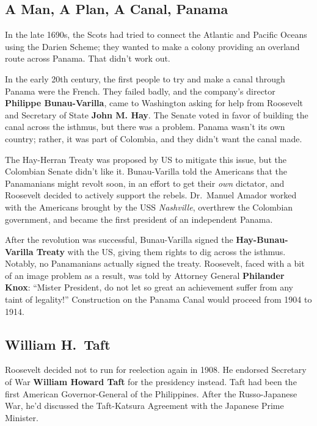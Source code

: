\subsection*{A Man, A Plan, A Canal, Panama}

In the late 1690s, the Scots had tried to connect the Atlantic and Pacific Oceans using the Darien Scheme;
they wanted to make a colony providing an overland route across Panama.
That didn't work out.

In the early 20th century, the first people to try and make a canal through Panama were the French.
They failed badly, and the company's director \textbf{Philippe Bunau-Varilla},
came to Washington asking for help from Roosevelt and Secretary of State \textbf{John M. Hay}.
The Senate voted in favor of building the canal across the isthmus, but there was a problem.
Panama wasn't its own country; rather, it was part of Colombia, and they didn't want the canal made.

The Hay-Herran Treaty was proposed by US to mitigate this issue, but the Colombian Senate didn't like it.
Bunau-Varilla told the Americans that the Panamanians might revolt soon,
in an effort to get their \textit{own} dictator,
and Roosevelt decided to actively support the rebels.
Dr.\ Manuel Amador worked with the Americans brought by the USS \textit{Nashville},
overthrew the Colombian government, and became the first president of an independent Panama.

After the revolution was successful,
Bunau-Varilla signed the \textbf{Hay-Bunau-Varilla Treaty} with the US, giving them rights to dig across the isthmus.
Notably, no Panamanians actually signed the treaty.
Roosevelt, faced with a bit of an image problem as a result,
was told by Attorney General \textbf{Philander Knox}:
``Mister President, do not let so great an achievement suffer from any taint of legality!''
Construction on the Panama Canal would proceed from 1904 to 1914.

\subsection*{William H.\ Taft}

Roosevelt decided not to run for reelection again in 1908.
He endorsed Secretary of War \textbf{William Howard Taft} for the presidency instead.
Taft had been the first American Governor-General of the Philippines.
After the Russo-Japanese War, he'd discussed the Taft-Katsura Agreement with the Japanese Prime Minister.

